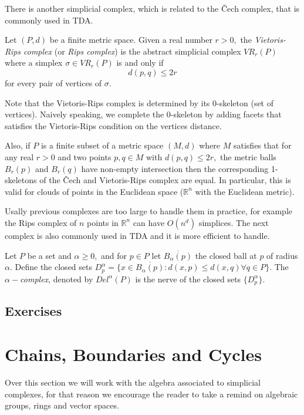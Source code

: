 \documentclass[
	fontsize=10pt, %
	twoside=false, %
	secnumdepth=1, %
]{kaobook}
\begin{document}
There is another simplicial complex, which is related to the \v{C}ech complex, that is commonly used in TDA. 

\begin{definition}
Let $(P,d)$ be a finite metric space. Given a real number $r>0,$ the \emph{Vietoris-Rips complex} (or \emph{Rips complex}) is the abstract simplicial complex $VR_r(P)$ where a simplex $\sigma\in VR_r(P)$ is and only if $$d(p,q)\leq 2r$$ for every pair of vertices of $\sigma.$
\end{definition}

Note that the Vietoris-Rips complex is determined by its 0-skeleton (set of vertices). Naively speaking, we complete the 0-skeleton by adding facets that satisfies the Vietoris-Rips condition on the vertices distance.

Also, if $P$ is a finite subset of a metric space $(M,d)$ where $M$ satisfies that for any real $r>0$ and two points $p,q\in M$ with $d(p,q)\leq 2r,$ the metric balls $B_r(p)$ and $B_r(q)$ have non-empty intersection then the corresponding 1-skeletons of the \v{C}ech and Vietoris-Rips complex are equal. In particular, this is valid for clouds of points in the Euclidean space ($\mathbb{R}^n$ with the Euclidean metric).

Usally previous complexes are too large to handle them in practice, for example the Rips complex of $n$ points in $\mathbb{R}^n$ can have $O(n^d)$ simplices. The next complex is also commonly used in TDA and it is more efficient to handle.

\begin{definition}
Let $P$ be a set and $\alpha\geq 0,$ and for $p\in P$ let $\overline{B_{\alpha} (p)}$ the closed ball at $p$ of radius $\alpha.$ Define the closed sets $D^{\alpha}_p=\{x\in \overline{B_{\alpha}(p)}: d(x,p)\leq d(x,q) \forall q\in P\}.$ The $\alpha-$\emph{complex}, denoted by $Del^{\alpha}(P)$ is the nerve of the closed sets $\{D^{\alpha}_p\}.$ 
\end{definition}

\subsection{Exercises}

\section{Chains, Boundaries and Cycles}

Over this section we will work with the algebra associated to simplicial complexes, for that reason we encourage the reader to take a remind on algebraic groups, rings and vector spaces.
\end{document}
